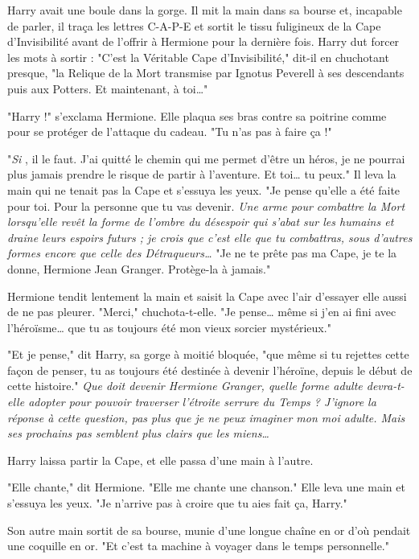 Harry avait une boule dans la gorge. Il mit la main dans sa bourse et, incapable de parler, il traça les lettres C-A-P-E et sortit le tissu fuligineux de la Cape d'Invisibilité avant de l'offrir à Hermione pour la dernière fois. Harry dut forcer les mots à sortir : "C'est la Véritable Cape d'Invisibilité," dit-il en chuchotant presque, "la Relique de la Mort transmise par Ignotus Peverell à ses descendants puis aux Potters. Et maintenant, à toi…"

"Harry !" s'exclama Hermione. Elle plaqua ses bras contre sa poitrine comme pour se protéger de l'attaque du cadeau. "Tu n'as pas à faire ça !"

"\emph{Si} , il le faut. J'ai quitté le chemin qui me permet d'être un héros, je ne pourrai plus jamais prendre le risque de partir à l'aventure. Et toi… tu peux." Il leva la main qui ne tenait pas la Cape et s'essuya les yeux. "Je pense qu'elle a été faite pour toi. Pour la personne que tu vas devenir. \emph{Une arme pour combattre la Mort lorsqu'elle revêt la forme de l'ombre du désespoir qui s'abat sur les humains et draine leurs espoirs futurs ; je crois que c'est elle que tu combattras, sous d'autres formes encore que celle des Détraqueurs…} "Je ne te prête pas ma Cape, je te la donne, Hermione Jean Granger. Protège-la à jamais."

Hermione tendit lentement la main et saisit la Cape avec l'air d'essayer elle aussi de ne pas pleurer. "Merci," chuchota-t-elle. "Je pense… même si j'en ai fini avec l'héroïsme… que tu as toujours été mon vieux sorcier mystérieux."

"Et je pense," dit Harry, sa gorge à moitié bloquée, "que même si tu rejettes cette façon de penser, tu as toujours été destinée à devenir l'héroïne, depuis le début de cette histoire." \emph{Que doit devenir Hermione Granger, quelle forme adulte devra-t-elle adopter pour pouvoir traverser l'étroite serrure du Temps ? J'ignore la réponse à cette question, pas plus que je ne peux imaginer mon moi adulte. Mais ses prochains pas semblent plus clairs que les miens…} 

Harry laissa partir la Cape, et elle passa d'une main à l'autre.

"Elle chante," dit Hermione. "Elle me chante une chanson." Elle leva une main et s'essuya les yeux. "Je n'arrive pas à croire que tu aies fait ça, Harry."

Son autre main sortit de sa bourse, munie d'une longue chaîne en or d'où pendait une coquille en or. "Et c'est ta machine à voyager dans le temps personnelle."

